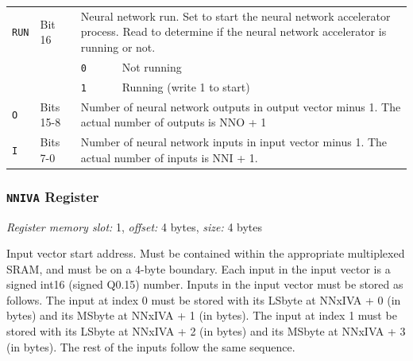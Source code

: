 \begin{tabularx}{\textwidth}{ l l l X }
\texttt{RUN} & Bit 16 & \multicolumn{2}{X}{Neural network run. Set to start the neural network accelerator process. Read to determine if the neural network accelerator is running or not.} \\
 & & \texttt{0} & Not running \\
 & & \cellcolor{tablehighlightcolor}\texttt{1} & \cellcolor{tablehighlightcolor}Running (write 1 to start) \\
\hline
\texttt{O} & Bits 15-8 & \multicolumn{2}{X}{Number of neural network outputs in output vector minus 1. The actual number of outputs is NNO + 1} \\
\hline
\texttt{I} & Bits 7-0 & \multicolumn{2}{X}{Number of neural network inputs in input vector minus 1. The actual number of inputs is NNI + 1.} \\
\hline
\end{tabularx}

\subsubsection{\texttt{NNIVA} Register} \label{ss:NNxIVA}
\noindent \textit{Register memory slot:} 1, \textit{offset:} 4 bytes, \textit{size:} 4 bytes

\noindent Input vector start address. Must be contained within the appropriate multiplexed SRAM, and must be on a 4-byte boundary. Each input in the input vector is a signed int16 (signed Q0.15) number. Inputs in the input vector must be stored as follows. The input at index 0 must be stored with its LSbyte at NNxIVA + 0 (in bytes) and its MSbyte at NNxIVA + 1 (in bytes). The input at index 1 must be stored with its LSbyte at NNxIVA + 2 (in bytes) and its MSbyte at NNxIVA + 3 (in bytes). The rest of the inputs follow the same sequence.

